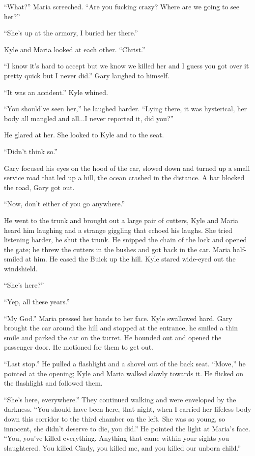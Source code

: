 ``What?'' Maria screeched. ``Are you fucking crazy? Where are we going
to see her?''

``She's up at the armory, I buried her there.''

Kyle and Maria looked at each other. ``Christ.''

``I know it's hard to accept but we know we killed her and I guess you
got over it pretty quick but I never did.'' Gary laughed to himself.

``It was an accident.'' Kyle whined.

``You should've seen her,'' he laughed harder. ``Lying there, it was
hysterical, her body all mangled and all...I never reported it, did
you?''

He glared at her. She looked to Kyle and to the seat.

``Didn't think so.''

Gary focused his eyes on the hood of the car, slowed down and turned up
a small service road that led up a hill, the ocean crashed in the
distance. A bar blocked the road, Gary got out.

``Now, don't either of you go anywhere.''

He went to the trunk and brought out a large pair of cutters, Kyle and
Maria heard him laughing and a strange giggling that echoed his laughs.
She tried listening harder, he shut the trunk. He snipped the chain of
the lock and opened the gate; he threw the cutters in the bushes and got
back in the car. Maria half-smiled at him. He eased the Buick up the
hill. Kyle stared wide-eyed out the windshield.

``She's here?''

``Yep, all these years.''

``My God.'' Maria pressed her hands to her face. Kyle swallowed hard.
Gary brought the car around the hill and stopped at the entrance, he
smiled a thin smile and parked the car on the turret. He bounded out and
opened the passenger door. He motioned for them to get out.

``Last stop.'' He pulled a flashlight and a shovel out of the back seat.
``Move,'' he pointed at the opening; Kyle and Maria walked slowly
towards it. He flicked on the flashlight and followed them.

``She's here, everywhere.'' They continued walking and were enveloped by
the darkness. ``You should have been here, that night, when I carried
her lifeless body down this corridor to the third chamber on the left.
She was so young, so innocent, she didn't deserve to die, you did.'' He
pointed the light at Maria's face. ``You, you've killed everything.
Anything that came within your sights you slaughtered. You killed Cindy,
you killed me, and you killed our unborn child.''

